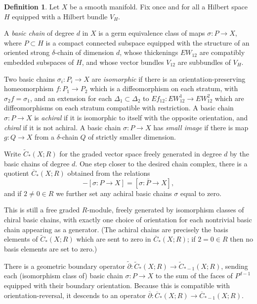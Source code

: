 \documentclass[10pt,a4paper]{amsart}
\theoremstyle{definition}
\newtheorem{definition}[theorem]{Definition}
\theoremstyle{remark}
\numberwithin{figure}{qchap}
\begin{document}
\begin{definition}\label{basicchain}Let $X$ be a smooth manifold. Fix once and for all a Hilbert space $H$ equipped with a Hilbert bundle $V_H$.

A \emph{basic chain} of degree $d$ in $X$ is a germ equivalence class of maps $\sigma: P \to X$, where $P\subset H$ is a compact connected subspace equipped with the structure of an oriented strong $\delta$-chain of dimension $d$, whose thickenings $EW_{12}$ are compatibly embedded subspaces of $H$, and whose vector bundles $V_{12}$ are subbundles of $V_H$. 

Two basic chains $\sigma_i: P_i \to X$ are \emph{isomorphic} if there is an orientation-preserving homeomorphism $f: P_1 \to P_2$ which is a diffeomorphism on each stratum, with $\sigma_2f = \sigma_1$, and an extension for each $\Delta_1 \subset \Delta_2$ to $Ef_{12}: EW_{12}^1 \to EW_{12}^2$ which are diffeomorphisms on each stratum compatible with restriction. 
A basic chain $\sigma: P \to X$ is \emph{achiral} if it is isomorphic to itself with the opposite orientation, and \emph{chiral} if it is not achiral. A basic chain $\sigma: P \to X$ has \emph{small image} if there is map $g: Q \to X$ from a $\delta$-chain $Q$ of strictly smaller dimension.
\end{definition}

Write $\widetilde C_*(X;R)$ for the graded vector space freely generated in degree $d$ by the basic chains of degree $d$. One step closer to the desired chain complex, there is a quotient $\overline C_*(X;R)$ obtained from the relations
$$- [\sigma: P \to X] = [\sigma: \overline P \to X],$$
and if $2 \neq 0 \in R$ we further set any achiral basic chains $\sigma$ equal to zero.

This is still a free graded $R$-module, freely generated by isomorphism classes of chiral basic chains, with exactly one choice of orientation for each nontrivial basic chain appearing as a generator. (The achiral chains are precisely the basis elements of $\widetilde C_*(X;R)$ which are sent to zero in $\overline C_*(X;R)$; if $2 = 0 \in R$ then no basis elements are set to zero.)

There is a geometric boundary operator $\widetilde\partial: \widetilde C_*(X;R) \to \widetilde C_{*-1}(X;R)$, sending each (isomorphism class of) basic chain $\sigma: P \to X$ to the sum of the faces of $P^{d-1}$ equipped with their boundary orientation. Because this is compatible with orientation-reversal, it descends to an operator $\overline \partial: \overline C_*(X;R) \to \overline C_{*-1}(X;R)$. 
\end{document}
